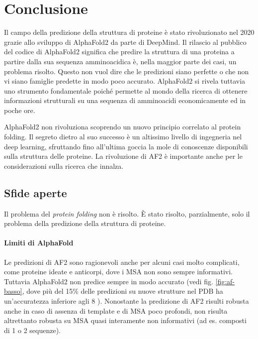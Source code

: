 \chapter{Conclusione}

Il campo della predizione della struttura di proteine è stato rivoluzionato nel 2020 grazie allo sviluppo di AlphaFold2 da parte di DeepMind. Il rilascio al pubblico del codice di AlphaFold2 significa che predire la struttura di una proteina a partire dalla sua sequenza amminoacidica è, nella maggior parte dei casi, un problema risolto. Questo non vuol dire che le predizioni siano perfette o che non vi siano famiglie predette in modo poco accurato. AlphaFold2 si rivela tuttavia uno strumento fondamentale poiché permette al mondo della ricerca di ottenere informazioni strutturali su una sequenza di amminoacidi economicamente ed in poche ore.

\par AlphaFold2 non rivoluziona scoprendo un nuovo principio correlato al protein folding. Il segreto dietro al suo successo è un altissimo livello di ingegneria nel deep learning, sfruttando fino all'ultima goccia la mole di conoscenze disponibili sulla struttura delle proteine. La rivoluzione di AF2 è importante anche per le considerazioni sulla ricerca che innalza.

\section{Sfide aperte}

Il problema del \textit{protein folding} non è risolto. È stato risolto, parzialmente, solo il problema della predizione della struttura di proteine.

\subsubsection{Limiti di AlphaFold}
Le predizioni di AF2 sono ragionevoli anche per alcuni casi molto complicati, come proteine ideate e anticorpi, dove i MSA non sono sempre informativi. Tuttavia AlphaFold2 non predice sempre in modo accurato (vedi fig. \ref{fig:af-basso}, dove più del 15\% delle predizioni su nuove strutture nel PDB ha un'accuratezza inferiore agli 8 \angstrom). Nonostante la predizione di AF2 risulti robusta anche in caso di assenza di template e di MSA poco profondi, non risulta altrettanto robusta su MSA quasi interamente non informativi (ad es. composti di 1 o 2 sequenze). 

